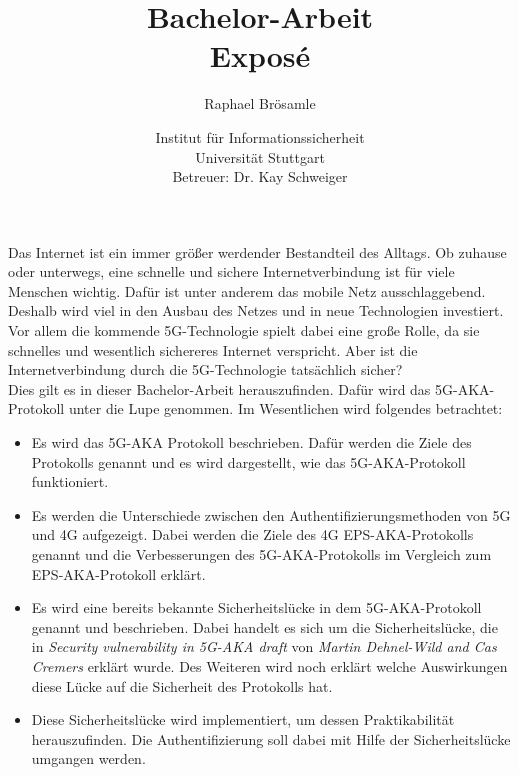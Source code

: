 \documentclass[12pt,pdftex,a4paper]{article}
\begin{document}
\title{Bachelor-Arbeit\\Exposé}
\author{Raphael Br\"osamle}
\date{Institut f\"ur Informationssicherheit\\
Universit\"at Stuttgart\\
Betreuer: Dr. Kay Schweiger}
\maketitle
Das Internet ist ein immer gr\"o{\ss}er werdender Bestandteil des Alltags. Ob zuhause oder unterwegs, eine schnelle und sichere Internetverbindung ist f\"ur viele Menschen wichtig. Daf\"ur ist unter anderem das mobile Netz ausschlaggebend. Deshalb wird viel in den Ausbau des Netzes und in neue Technologien investiert. Vor allem die kommende 5G-Technologie spielt dabei eine gro{\ss}e Rolle, da sie schnelles und wesentlich sichereres Internet verspricht. Aber ist die Internetverbindung durch die 5G-Technologie tats\"achlich sicher?\\
Dies gilt es in dieser Bachelor-Arbeit herauszufinden. Daf\"ur wird das 5G-AKA-Protokoll unter die Lupe genommen. Im Wesentlichen wird folgendes betrachtet: 
\begin{itemize}
\item Es wird das 5G-AKA Protokoll beschrieben. Daf\"ur werden die Ziele des Protokolls genannt und es wird dargestellt, wie das 5G-AKA-Protokoll funktioniert.
\item Es werden die Unterschiede zwischen den Authentifizierungsmethoden von 5G und 4G aufgezeigt. Dabei werden die Ziele des 4G EPS-AKA-Protokolls genannt und die Verbesserungen des 5G-AKA-Protokolls im Vergleich zum EPS-AKA-Protokoll erkl\"art.
\item Es wird eine bereits bekannte Sicherheitsl\"ucke in dem 5G-AKA-Protokoll genannt und beschrieben. Dabei handelt es sich um die Sicherheitsl\"ucke, die in \textit{Security vulnerability in 5G-AKA draft}\cite{dehnel2018security} von \textit{Martin Dehnel-Wild and Cas Cremers} erkl\"art wurde. Des Weiteren wird noch erkl\"art welche Auswirkungen diese L\"ucke auf die Sicherheit des Protokolls hat.
\item Diese Sicherheitslücke\cite{dehnel2018security} wird implementiert, um dessen Praktikabilit\"at herauszufinden. Die Authentifizierung soll dabei mit Hilfe der Sicherheitsl\"ucke umgangen werden.
\end{itemize}

	

\end{document}
